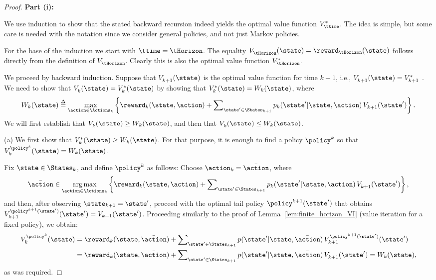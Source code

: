\begin{proof}
\textbf{Part (i):}

We use induction to show that the stated backward recursion indeed
yields the optimal value function $V_\ttime^*$. The idea is simple,
but some care is needed with the notation since we consider general
policies, and not just Markov policies.

For the base of the induction we start with $\ttime=\tHorizon$. The
equality $V_\tHorizon^{}(\state) = {\reward_\tHorizon}(\state)$
follows directly from the definition of $V_\tHorizon^{}$. Clearly
this is also the optimal value function $V^*_{\tHorizon}$.

We proceed by backward induction. Suppose that $V_{k +
1}^{}(\state)$ is the optimal value function for time $k + 1$, i.e.,
$V_{k + 1}^{}(\state)=V^*_{k+1}$ . We need to show that
$V_k^{}(\state) = V^*_k(\state)$ by showing that
$V^*_k(\state)={W_k}(\state)$, where
 \[{W_k}(\state) \buildrel \Delta \over = {\max _{\action \in {\Actions_k}}}\left\{ {{\reward_k}(\state,\action) + \sum\nolimits_{\state' \in {\States_{k + 1}}} {{p_k}(\state'|\state,\action)\,} V_{k + 1}^{}(\state')} \right\}.\]
We will first establish that $V_k^{}(\state) \ge {W_k}(\state)$, and
then that $V_k^{}(\state) \le {W_k}(\state)$.

(a) We first show that $V_k^{*}(\state) \ge {W_k}(\state)$. For that
purpose, it is enough to find a policy ${\policy ^k}$ so that
$V_k^{{\policy ^k}}(\state) = {W_k}(\state)$.

Fix $\state \in {\States_k}$, and define ${\policy ^k}$ as follows:
Choose ${\action_k} = \bar \action$, where
\[\bar{\action} \in \mathop {\arg \max }\limits_{\action \in {\Actions_k}} \left\{ {{\reward_k}(\state,\action) + \sum\nolimits_{\state' \in {\States_{k + 1}}} {{p_k}(\state'|\state,\action)} \,V_{k + 1}^{}(\state')} \right\},\]
and then, after observing  ${\state_{k + 1}} = \state'$, proceed
with the optimal tail policy ${\policy ^{k + 1}}(\state')$ that
obtains $V_{k + 1}^{{\policy ^{k + 1}}(\state')}(\state') = {V_{k +
1}}(\state')$. Proceeding similarly to
the proof of Lemma~\ref{lem:finite_horizon_VI} (value iteration for
a fixed policy), we obtain:
\begin{align}
V_k^{{\policy ^k}}(\state) &= {\reward_k}(\state,\bar \action) + \sum\nolimits_{\state' \in {\States_{k + 1}}} {p(\state'|\state,\bar \action)\,} V_{k + 1}^{{\policy ^{k + 1}}(\state')}(\state')\\
 &= {\reward_k}(\state,\bar \action) + \sum\nolimits_{\state' \in {\States_{k + 1}}} {p(\state'|\state,\bar \action)} \,V_{k + 1}^{}(\state') = {W_k}(\state),
\end{align}
as was required.


\end{proof}
